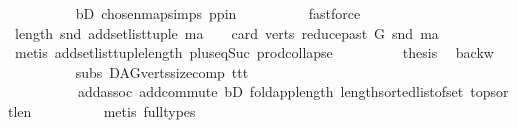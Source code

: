\begin{isabellebody}
\ \ \ \ \ \ \ \ \isamarkupfalse%
\ bD\ chosen{\isacharunderscore}{\kern0pt}map{\isacharunderscore}{\kern0pt}simps{\isacharparenleft}{\kern0pt}{}{\isacharparenright}{\kern0pt}\ pp{\isacharunderscore}{\kern0pt}in\isanewline
\ \ \ \ \ \ \ \ \isamarkupfalse%
\ fastforce\ \ \isanewline
\ \ \ \ \ \ \isamarkupfalse%
\ \isamarkupfalse%
\ {\isachardoublequoteopen}length\ {\isacharparenleft}{\kern0pt}snd\ {\isacharparenleft}{\kern0pt}add{\isacharunderscore}{\kern0pt}set{\isacharunderscore}{\kern0pt}list{\isacharunderscore}{\kern0pt}tuple\ ma{\isacharparenright}{\kern0pt}{\isacharparenright}{\kern0pt}\ {\isacharequal}{\kern0pt}\ {}\ {\isacharplus}{\kern0pt}\ card\ {\isacharparenleft}{\kern0pt}verts\ {\isacharparenleft}{\kern0pt}reduce{\isacharunderscore}{\kern0pt}past\ G\ {\isacharparenleft}{\kern0pt}snd\ ma{\isacharparenright}{\kern0pt}{\isacharparenright}{\kern0pt}{\isacharparenright}{\kern0pt}{\isachardoublequoteclose}\isanewline
\ \ \ \ \ \ \ \ \isamarkupfalse%
\ {\isacharparenleft}{\kern0pt}metis\ add{\isacharunderscore}{\kern0pt}set{\isacharunderscore}{\kern0pt}list{\isacharunderscore}{\kern0pt}tuple{\isacharunderscore}{\kern0pt}length\ plus{\isacharunderscore}{\kern0pt}{}{\isacharunderscore}{\kern0pt}eq{\isacharunderscore}{\kern0pt}Suc\ prod{\isachardot}{\kern0pt}collapse{\isacharparenright}{\kern0pt}\isanewline
\ \ \ \ \ \ \isamarkupfalse%
\ \isamarkupfalse%
\ {\isacharquery}{\kern0pt}thesis\ \isamarkupfalse%
\ backw\isanewline
\ \ \ \ \ \ \ \ \isamarkupfalse%
\ subs\ DAG{\isachardot}{\kern0pt}verts{\isacharunderscore}{\kern0pt}size{\isacharunderscore}{\kern0pt}comp\ ttt\isanewline
\ \ \ \ \ \ \ \ \ \ add{\isachardot}{\kern0pt}assoc\ add{\isachardot}{\kern0pt}commute\ bD\ fold{\isacharunderscore}{\kern0pt}app{\isacharunderscore}{\kern0pt}length\ length{\isacharunderscore}{\kern0pt}sorted{\isacharunderscore}{\kern0pt}list{\isacharunderscore}{\kern0pt}of{\isacharunderscore}{\kern0pt}set\ top{\isacharunderscore}{\kern0pt}sort{\isacharunderscore}{\kern0pt}len\isanewline
\ \ \ \ \ \ \ \ \isamarkupfalse%
\ {\isacharparenleft}{\kern0pt}metis\ {\isacharparenleft}{\kern0pt}full{\isacharunderscore}{\kern0pt}types{\isacharparenright}{\kern0pt}{\isacharparenright}{\kern0pt}\ \ \ \isanewline
\ \ \ \ \isamarkupfalse%
\isanewline
\ \ \isamarkupfalse%
\isanewline
{}\isamarkupfalse%
%
\endisatagproof
{\isafoldproof}%
%
\isadelimproof

\end{isabellebody}
